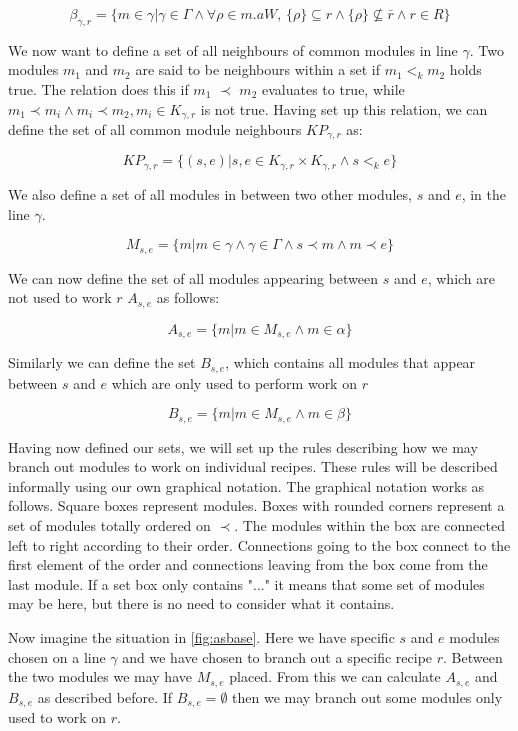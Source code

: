 \[\beta_{\gamma ,r}  = \{m \in \gamma | \gamma \in \Gamma \land \forall \rho \in m.aW,\, \{\rho\} \subseteq r \land \{\rho\} \nsubseteq \bar{r} \land r \in R\}\]

We now want to define a set of all neighbours of common modules in line $\gamma$. Two modules $m_1$ and $m_2$ are said to be neighbours within a set if $m_1 <_k m_2$ holds true. The relation does this if $m_1$ $\prec$ $m_2$ evaluates to true, while $m_1 \prec m_i \land m_i \prec m_2, m_i \in K_{\gamma ,r}$ is not true. Having set up this relation, we can define the set of all common module neighbours $KP_{\gamma ,r}$ as:
 
\[KP_{\gamma ,r} = \{(s, e)| {s, e} \in K_{\gamma ,r} \times K_{\gamma ,r} \land s <_k  e\}\]


We also define a set of all modules in between two other modules, $s$ and $e$, in the line $\gamma$. 

\[M_{s,e} = \{m | m \in \gamma \land \gamma \in \Gamma \land s \prec m \land m \prec e\}\]

We can now define the set of all modules appearing between $s$ and $e$, which are not used to work $r$ $A_{s,e}$ as follows: 

\[A_{s,e} = \{m |m \in M_{s,e} \land m \in \alpha\}\]

Similarly we can define the set $B_{s,e}$, which contains all modules that appear between $s$ and $e$ which are only used to perform work on $r$

\[B_{s,e} = \{m |m \in M_{s,e} \land m \in \beta\}\]

Having now defined our sets, we will set up the rules describing how we may branch out modules to work on individual recipes. These rules will be described informally using our own graphical notation. The graphical notation works as follows. Square boxes represent modules. Boxes with rounded corners represent a set of modules totally ordered on $\prec$. The modules within the box are connected left to right according to their order. Connections going to the box connect to the first element of the order and connections leaving from the box come from the last module. If a set box only contains "..." it means that some set of modules may be here, but there is no need to consider what it contains. 

Now imagine the situation in \cref{fig:asbase}. Here we have specific $s$ and $e$ modules chosen on a line $\gamma$ and we have chosen to branch out a specific recipe $r$. Between the two modules we may have $M_{s,e}$ placed. From this we can calculate $A_{s,e}$ and $B_{s,e}$ as described before. If $B_{s,e} = \emptyset$ then we may branch out some modules only used to work on $r$. 


